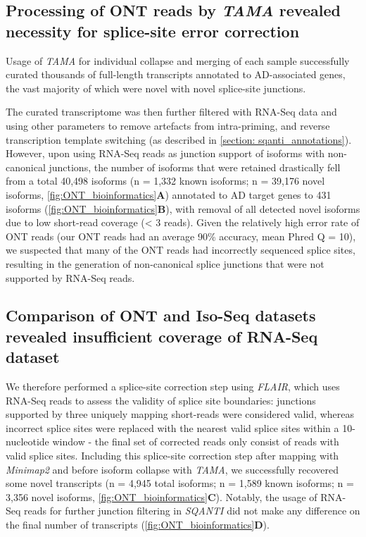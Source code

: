 \subsection{Processing of ONT reads by \textit{TAMA} revealed necessity for splice-site error correction}
Usage of \textit{TAMA} for individual collapse and merging of each sample successfully curated thousands of full-length transcripts annotated to AD-associated genes, the vast majority of which were novel with novel splice-site junctions. 

The curated transcriptome was then further filtered with RNA-Seq data and using other parameters to remove artefacts from intra-priming, and reverse transcription template switching (as described in \cref{section: sqanti_annotations}). However, upon using RNA-Seq reads as junction support of isoforms with non-canonical junctions, the number of isoforms that were retained drastically fell from a total 40,498 isoforms (n = 1,332 known isoforms; n = 39,176 novel isoforms, \cref{fig:ONT_bioinformatics}\textbf{A}) annotated to AD target genes to 431 isoforms (\cref{fig:ONT_bioinformatics}\textbf{B}), with removal of all detected novel isoforms due to low short-read coverage (< 3 reads). Given the relatively high error rate of ONT reads (our ONT reads had an average 90\% accuracy, mean Phred Q = 10), we suspected that many of the ONT reads had incorrectly sequenced splice sites, resulting in the generation of non-canonical splice junctions that were not supported by RNA-Seq reads.


\subsection{Comparison of ONT and Iso-Seq datasets revealed insufficient coverage of RNA-Seq dataset}
We therefore performed a splice-site correction step using \textit{FLAIR}\cite{Tang2020}, which uses RNA-Seq reads to assess the validity of splice site boundaries: junctions supported by three uniquely mapping short-reads were considered valid, whereas incorrect splice sites were replaced with the nearest valid splice sites within a 10-nucleotide window - the final set of corrected reads only consist of reads with valid splice sites\cite{Tang2020}. Including this splice-site correction step after mapping with \textit{Minimap2} and before isoform collapse with \textit{TAMA}, we successfully recovered some novel transcripts (n = 4,945 total isoforms; n = 1,589 known isoforms; n = 3,356 novel isoforms, \cref{fig:ONT_bioinformatics}\textbf{C}). Notably, the usage of RNA-Seq reads for further junction filtering in \textit{SQANTI} did not make any difference on the final number of transcripts (\cref{fig:ONT_bioinformatics}\textbf{D}).  

